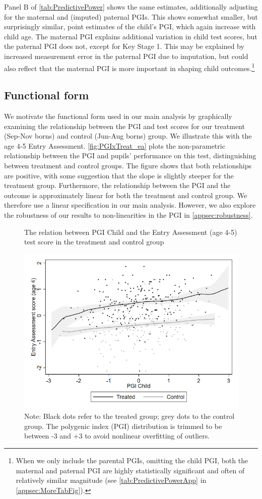 \documentclass[12pt,a4paper]{article}
\begin{document}
\begin{bibunit}
Panel B of \autoref{tab:PredictivePower} shows the same estimates, additionally adjusting for the maternal and (imputed) paternal PGIs. This shows somewhat smaller, but surprisingly similar, point estimates of the child's PGI, which again increase with child age. The maternal PGI explains additional variation in child test scores, but the paternal PGI does not, except for Key Stage 1. This may be explained by increased measurement error in the paternal PGI due to imputation, but could also reflect that the maternal PGI is more important in shaping child outcomes.\footnote{When we only include the parental PGIs, omitting the child PGI, both the maternal and paternal PGI are highly statistically significant and often of relatively similar magnitude (see \autoref{tab:PredictivePowerApp} in \autoref{appsec:MoreTabFig}).}

\subsection{Functional form} \label{sec:form}
We motivate the functional form used in our main analysis by graphically examining the relationship between the PGI and test scores for our treatment (Sep-Nov borns) and control (Jun-Aug borns) group. We illustrate this with the age 4-5 Entry Assessment. \autoref{fig:PGIxTreat_ea} plots the non-parametric relationship between the PGI and pupils' performance on this test, distinguishing between treatment and control groups. The figure shows that both relationships are positive, with some suggestion that the slope is slightly steeper for the treatment group. Furthermore, the relationship between the PGI and the outcome is approximately linear for both the treatment and control group. We therefore use a linear specification in our main analysis. However, we also explore the robustness of our results to non-linearities in the PGI in \autoref{appsec:robustness}.

\begin{figure}[H]
\centering 
\caption{The relation between PGI Child and the Entry Assessment (age 4-5) test score in the treatment and control group}
\includegraphics[width=0.6\linewidth]{include/PGSxTreat_ea.png}
\caption*{\footnotesize Note: Black dots refer to the treated group; grey dots to the control group. The polygenic index (PGI) distribution is trimmed to be between -3 and +3 to avoid nonlinear overfitting of outliers.}
\label{fig:PGIxTreat_ea}
\end{figure}


\end{bibunit}
\end{document}
